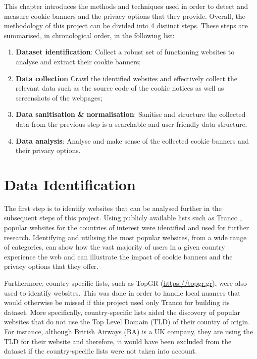 \documentclass[../main.tex]{subfiles}
\begin{document}
This chapter introduces the methods and techniques used in order to detect and measure cookie banners and the privacy options that they provide. Overall, the methodology of this project can be divided into 4 distinct steps. These steps are summarised, in chronological order, in the following list:

\begin{enumerate}
    \item \textbf{Dataset identification}: Collect a robust set of functioning websites to analyse and extract their cookie banners;
    
    \item \textbf{Data collection} Crawl the identified websites and effectively collect the relevant data such as the source code of the cookie notices as well as screenshots of the webpages;
    
    \item \textbf{Data sanitisation \& normalisation}: Sanitise and structure the collected data from the previous step is a searchable and user friendly data structure.
    
    \item \textbf{Data analysis}: Analyse and make sense of the collected cookie banners and their privacy options. 
\end{enumerate}

\section{Data Identification}
The first step is to identify websites that can be analysed further in the subsequent steps of this project. Using publicly available lists such as Tranco \cite{LePochat2019}, popular websites for the countries of interest were identified and used for further research. Identifying and utilising the most popular websites, from a wide range of categories, can show how the vast majority of users in a given country experience the web and can illustrate the impact of cookie banners and the privacy options that they offer.

Furthermore, country-specific lists, such as TopGR (\url{https://topgr.gr}), were also used to identify websites. This was done in order to handle local nuances that would otherwise be missed if this project used only Tranco for building its dataset. More specifically, country-specific lists aided the discovery of popular websites that do not use the Top Level Domain (TLD) of their country of origin. For instance, although British Airways (BA) is a UK company, they are using the  TLD for their website and therefore, it would have been excluded from the dataset if the country-specific lists were not taken into account.
\end{document}
